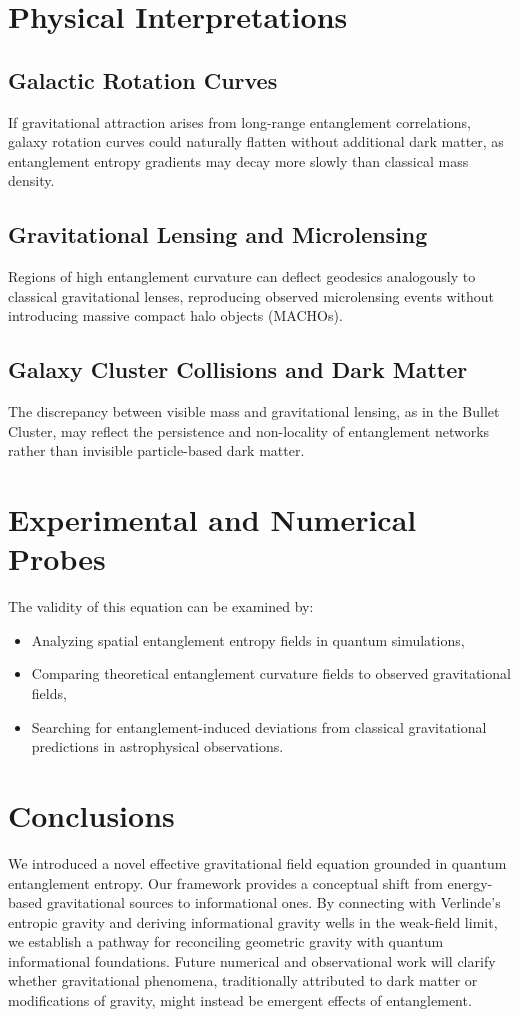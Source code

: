 \documentclass[12pt]{article}
\begin{document}
\section{Physical Interpretations}
\subsection{Galactic Rotation Curves}
If gravitational attraction arises from long-range entanglement correlations, galaxy rotation curves could naturally flatten without additional dark matter, as entanglement entropy gradients may decay more slowly than classical mass density.

\subsection{Gravitational Lensing and Microlensing}
Regions of high entanglement curvature can deflect geodesics analogously to classical gravitational lenses, reproducing observed microlensing events without introducing massive compact halo objects (MACHOs).

\subsection{Galaxy Cluster Collisions and Dark Matter}
The discrepancy between visible mass and gravitational lensing, as in the Bullet Cluster, may reflect the persistence and non-locality of entanglement networks rather than invisible particle-based dark matter.

\section{Experimental and Numerical Probes}
The validity of this equation can be examined by:
\begin{itemize}
    \item Analyzing spatial entanglement entropy fields in quantum simulations,
    \item Comparing theoretical entanglement curvature fields to observed gravitational fields,
    \item Searching for entanglement-induced deviations from classical gravitational predictions in astrophysical observations.
\end{itemize}

\section{Conclusions}
We introduced a novel effective gravitational field equation grounded in quantum entanglement entropy. Our framework provides a conceptual shift from energy-based gravitational sources to informational ones. By connecting with Verlinde's entropic gravity and deriving informational gravity wells in the weak-field limit, we establish a pathway for reconciling geometric gravity with quantum informational foundations. Future numerical and observational work will clarify whether gravitational phenomena, traditionally attributed to dark matter or modifications of gravity, might instead be emergent effects of entanglement.
\end{document}
